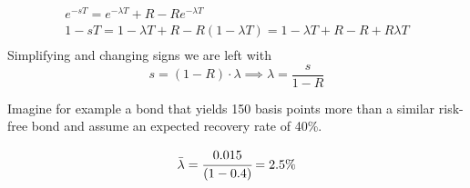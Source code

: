 \begin{equation}
\begin{gathered}
e^{-sT} = e^{-\lambda T} + R - R e^{-\lambda T} \\
1 - sT = 1 - \lambda T + R - R(1 - \lambda T) = 1 - \lambda T + R - R + R\lambda T\\
\end{gathered}
\end{equation}
Simplifying and changing signs we are left with
\begin{equation}
s = (1 - R)\cdot \lambda \implies \lambda = \frac{s}{1-R}
\end{equation}

Imagine for example a bond that yields 150 basis points more than a similar risk-free bond and assume an expected recovery rate of 40\%.

\begin{equation*}
\bar{\lambda} = \cfrac{0.015}{(1-0.4)} = 2.5\%
\end{equation*}









